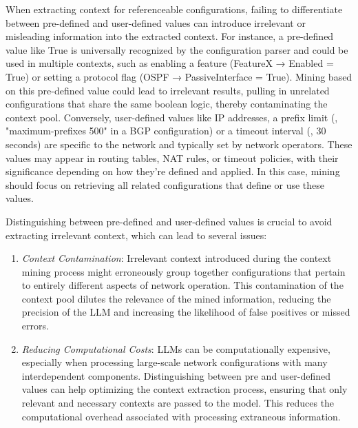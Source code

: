 When extracting context for referenceable configurations,
failing to differentiate between pre-defined and user-defined values can introduce irrelevant or misleading information into the extracted context.
For instance, a pre-defined value like True is universally recognized by the configuration parser and could be used in multiple contexts, such as enabling a feature (FeatureX → Enabled = True) or setting a protocol flag (OSPF → PassiveInterface = True). Mining based on this pre-defined value could lead to irrelevant results, pulling in unrelated configurations that share the same boolean logic, thereby contaminating the context pool.
Conversely, user-defined values like IP addresses, a prefix limit (\eg, "maximum-prefixes 500" in a BGP configuration) or a timeout interval (\eg, 30 seconds) are specific to the network and typically set by network operators. These values may appear in routing tables, NAT rules, or timeout policies, with their significance depending on how they’re defined and applied. In this case, mining should focus on retrieving all related configurations that define or use these values.

Distinguishing between pre-defined and user-defined values is crucial to avoid extracting irrelevant context, which can lead to several issues:

\begin{enumerate}
    \item \textit{Context Contamination}: 
    Irrelevant context introduced during the context mining process might erroneously group together configurations that pertain to entirely different aspects of network operation.
    This contamination of the context pool dilutes the relevance of the mined information, reducing the precision of the LLM and increasing the likelihood of false positives or missed errors. 
    \item \textit{Reducing Computational Costs}: LLMs can be computationally expensive, especially when processing large-scale network configurations with many interdependent components. Distinguishing between pre and user-defined values can help optimizing the context extraction process, ensuring that only relevant and necessary contexts are passed to the model. This reduces the computational overhead associated with processing extraneous information.

\end{enumerate}

